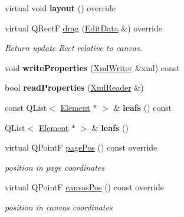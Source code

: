 \begin{DoxyCompactItemize}
virtual void {\bfseries layout} () override
\item 
\mbox{\label{class_ms_1_1_b_symbol_a64544cc8ec4f0f4c526ba41032368112}} 
virtual Q\+RectF \hyperlink{class_ms_1_1_b_symbol_a64544cc8ec4f0f4c526ba41032368112}{drag} (\hyperlink{class_ms_1_1_edit_data}{Edit\+Data} \&) override
\begin{DoxyCompactList}\small\item\em Return update Rect relative to canvas. \end{DoxyCompactList}\item 
\mbox{\label{class_ms_1_1_b_symbol_ab3235f07fa22239c50e6251317e66858}} 
void {\bfseries write\+Properties} (\hyperlink{class_ms_1_1_xml_writer}{Xml\+Writer} \&xml) const
\item 
\mbox{\label{class_ms_1_1_b_symbol_aad9224946703d521677ead5a764f7887}} 
bool {\bfseries read\+Properties} (\hyperlink{class_ms_1_1_xml_reader}{Xml\+Reader} \&)
\item 
\mbox{\label{class_ms_1_1_b_symbol_a1281b1c2e71e044a9c26e573a10731eb}} 
const Q\+List$<$ \hyperlink{class_ms_1_1_element}{Element} $\ast$ $>$ \& {\bfseries leafs} () const
\item 
\mbox{\label{class_ms_1_1_b_symbol_af9c7f60e2fe4ff8da81f75a05c56ebfc}} 
Q\+List$<$ \hyperlink{class_ms_1_1_element}{Element} $\ast$ $>$ \& {\bfseries leafs} ()
\item 
\mbox{\label{class_ms_1_1_b_symbol_a8b70d8f8c6030d8d067745ef53bc8d75}} 
virtual Q\+PointF \hyperlink{class_ms_1_1_b_symbol_a8b70d8f8c6030d8d067745ef53bc8d75}{page\+Pos} () const override
\begin{DoxyCompactList}\small\item\em position in page coordinates \end{DoxyCompactList}\item 
\mbox{\label{class_ms_1_1_b_symbol_a0b7b4639940db3355508a9fd985d3df2}} 
virtual Q\+PointF \hyperlink{class_ms_1_1_b_symbol_a0b7b4639940db3355508a9fd985d3df2}{canvas\+Pos} () const override
\begin{DoxyCompactList}\small\item\em position in canvas coordinates \end{DoxyCompactList}\item 

\end{DoxyCompactItemize}
